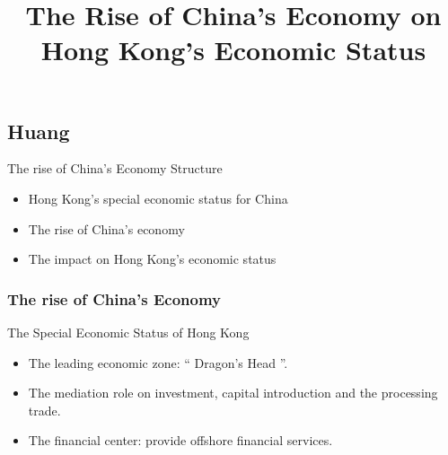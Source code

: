 \documentclass[slidestop,uncompress,mathsans, 12pt]{beamer}
\begin{document}
\subsection{Huang}
\begin{frame}
\title {The Rise of China's Economy on Hong Kong's Economic Status}
\date{}
\titlepage
\end{frame}
\begin{frame}{The rise of China's Economy}
Structure\\
\begin{itemize}
\item Hong Kong's special economic status for China\\
\item The rise of China's economy\\
\item The impact on Hong Kong's economic status\\

\end{itemize}

\end{frame}
\begin{frame}
\frametitle{The rise of China's Economy}
The Special Economic Status of Hong Kong\\
\bigskip
{}%
\begin{itemize}[<+->]
\item The leading economic zone: “ Dragon's Head ”.
\item The mediation role on investment, capital introduction and the processing trade.
\item The financial center: provide offshore financial services.
\end{itemize}
\pause
\end{frame}
\end{document}
